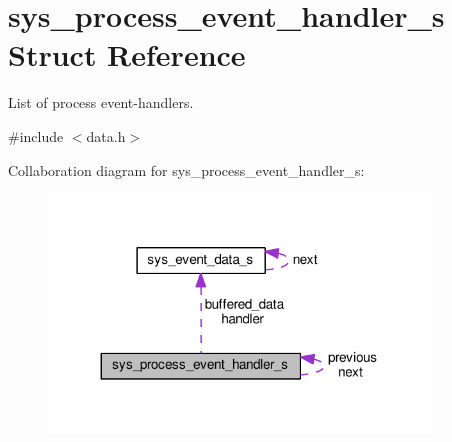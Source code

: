 \hypertarget{structsys__process__event__handler__s}{}\section{sys\+\_\+process\+\_\+event\+\_\+handler\+\_\+s Struct Reference}
\label{structsys__process__event__handler__s}


List of process event-\/handlers.  




{\ttfamily \#include $<$data.\+h$>$}



Collaboration diagram for sys\+\_\+process\+\_\+event\+\_\+handler\+\_\+s\+:\nopagebreak
\begin{figure}[H]
\begin{center}
\leavevmode
\includegraphics[width=287pt]{d8/d90/structsys__process__event__handler__s__coll__graph}
\end{center}
\end{figure}
